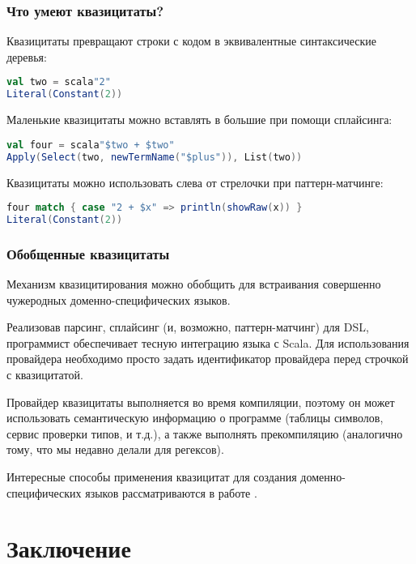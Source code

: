 \documentclass[hyperref={bookmarks=false}]{beamer}
\begin{document}
\begin{frame}[t,fragile]
\frametitle{Что умеют квазицитаты?}

Квазицитаты превращают строки с кодом в эквивалентные синтаксические деревья:

\begin{lstlisting}[language=scala]
val two = scala"2"
Literal(Constant(2))
\end{lstlisting}

Маленькие квазицитаты можно вставлять в большие при помощи сплайсинга:

\begin{lstlisting}[language=scala]
val four = scala"$two + $two"
Apply(Select(two, newTermName("$plus")), List(two))
\end{lstlisting}%

Квазицитаты можно использовать слева от стрелочки при паттерн-матчинге:

\begin{lstlisting}[language=scala]
four match { case "2 + $x" => println(showRaw(x)) }
Literal(Constant(2))
\end{lstlisting}%
\end{frame}

\begin{frame}[t,fragile]
\frametitle{Обобщенные квазицитаты}
Механизм квазицитирования можно обобщить для встраивания совершенно чужеродных доменно-специфических языков.

Реализовав парсинг, сплайсинг (и, возможно, паттерн-матчинг) для DSL, программист обеспечивает тесную интеграцию языка с Scala. Для использования провайдера необходимо просто задать идентификатор провайдера перед строчкой с квазицитатой.

Провайдер квазицитаты выполняется во время компиляции, поэтому он может использовать семантическую информацию о программе (таблицы символов, сервис проверки типов, и т.д.), а также выполнять прекомпиляцию (аналогично тому, что мы недавно делали для регексов).

Интересные способы применения квазицитат для создания доменно-специфических языков рассматриваются в работе .

\end{frame}

\section{Заключение}
\end{document}

